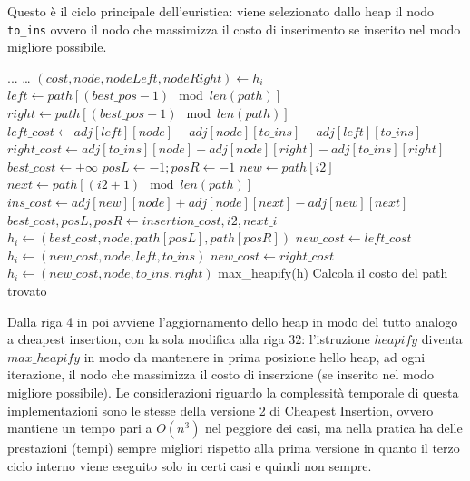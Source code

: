 \documentclass[a4paper,12pt]{report}
\begin{document}
Questo è il ciclo principale dell'euristica: viene selezionato dallo heap il nodo \lstinline!to_ins! ovvero il nodo che massimizza il costo di inserimento se inserito nel modo migliore possibile.
\begin{tcolorbox}[colframe=black, colback=white, boxrule=0.5pt, title=Furthest Insertion Versione 2, coltitle=black, fonttitle=\bfseries, colbacktitle=white, breakable]
  \begin{algorithmic}[1]
    \State ...
      \State \dots
        \State $(cost, node, nodeLeft, nodeRight) \gets h_i$
        \State $left \gets path[(best\_pos - 1) \mod len(path)]$
        \State $right \gets path[(best\_pos + 1) \mod len(path)]$
        \State $left\_cost \gets adj[left][node] + adj[node][to\_ins] - adj[left][to\_ins]$
        \State $right\_cost \gets adj[to\_ins][node] + adj[node][right] - adj[to\_ins][right]$
          \State $best\_cost \gets +\infty$
          \State $posL \gets -1; posR \gets -1$
            \State $new \gets path[i2]$
            \State $next \gets path[(i2 + 1) \mod len(path)]$
            \State $ins\_cost \gets adj[new][node] + adj[node][next] - adj[new][next]$
              \State $best\_cost, posL, posR \gets insertion\_cost, i2, next\_i$
            \EndIf
          \EndFor
          \State $h_i \gets (best\_cost, node, path[posL], path[posR])$
        \EndIf
          \State $new\_cost \gets left\_cost$
          \State $h_i \gets (new\_cost, node, left, to\_ins)$
        \EndIf
          \State $new\_cost \gets right\_cost$
          \State $h_i \gets (new\_cost, node, to\_ins, right)$
        \EndIf
      \EndFor
      \State max\_heapify(h)
    \EndWhile
    \State Calcola il costo del path trovato
  \end{algorithmic}
\end{tcolorbox}
Dalla riga 4 in poi avviene l'aggiornamento dello heap in modo del tutto analogo a cheapest insertion, con la sola modifica alla riga 32: l'istruzione $heapify$ diventa $max\_heapify$ in modo da mantenere in prima posizione hello heap, ad ogni iterazione, il nodo che massimizza il costo di inserzione (se inserito nel modo migliore possibile).\newline
Le considerazioni riguardo la complessità temporale di questa implementazioni sono le stesse della versione 2 di Cheapest Insertion, ovvero mantiene un tempo pari a $O(n^3)$ nel peggiore dei casi, ma nella pratica ha delle prestazioni (tempi) sempre migliori rispetto alla prima versione in quanto il terzo ciclo interno viene eseguito solo in certi casi e quindi non sempre.
\end{document}
